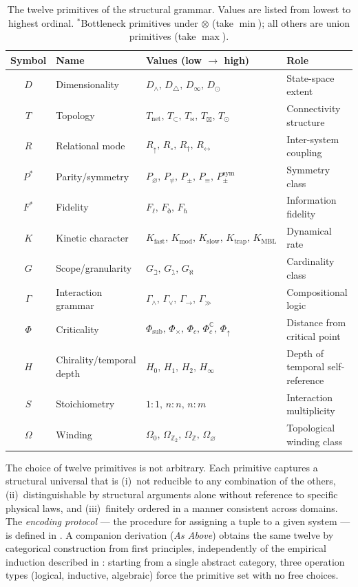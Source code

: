 \documentclass[12pt,a4paper]{article}
\newcommand{\Phic}{\Phi_c}
\newcommand{\Ppms}{P_{\pm}^{\text{sym}}}
\newcommand{\Tbw}{T_{\mathord{\bowtie}}}
\newcommand{\Tin}{T_{\mathord{\subset}}}
\newcommand{\Tbox}{T_{\mathord{\boxtimes}}}
\begin{document}
\begin{table}[htbp]
\centering
\caption{The twelve primitives of the structural grammar.
Values are listed from lowest to highest ordinal.
$^*$Bottleneck primitives under $\otimes$ (take $\min$);
all others are union primitives (take $\max$).}
\label{tab:primitives}
\small
\begin{tabular}{@{}clll@{}}
\toprule
Symbol & Name & Values (low $\to$ high) & Role \\
\midrule
$D$ & Dimensionality &
  $D_\wedge,\, D_\triangle,\, D_\infty,\, D_\odot$ &
  State-space extent \\
$T$ & Topology &
  $T_\text{net},\, \Tin,\, \Tbw,\, \Tbox,\, T_\odot$ &
  Connectivity structure \\
$R$ & Relational mode &
  $R_\uparrow,\, R_\circ,\, R_\dagger,\, R_\leftrightarrow$ &
  Inter-system coupling \\
$P^*$ & Parity/symmetry &
  $P_\varnothing,\, P_\psi,\, P_\pm,\, P_\equiv,\, \Ppms$ &
  Symmetry class \\
$F^*$ & Fidelity &
  $F_\ell,\, F_\eth,\, F_\hbar$ &
  Information fidelity \\
$K$ & Kinetic character &
  $K_\text{fast},\, K_\text{mod},\, K_\text{slow},\, K_\text{trap},\, K_\text{MBL}$ &
  Dynamical rate \\
$G$ & Scope/granularity &
  $G_\beth,\, G_\gimel,\, G_\aleph$ &
  Cardinality class \\
$\Gamma$ & Interaction grammar &
  $\Gamma_\wedge,\, \Gamma_\vee,\, \Gamma_{\to},\, \Gamma_{\gg}$ &
  Compositional logic \\
$\Phi$ & Criticality &
  $\Phi_\text{sub},\, \Phi_\times,\, \Phic,\, \Phic^\mathbb{C},\, \Phi_\uparrow$ &
  Distance from critical point \\
$H$ & Chirality/temporal depth &
  $H_0,\, H_1,\, H_2,\, H_\infty$ &
  Depth of temporal self-reference \\
$S$ & Stoichiometry &
  $1{:}1,\, n{:}n,\, n{:}m$ &
  Interaction multiplicity \\
$\Omega$ & Winding &
  $\Omega_0,\, \Omega_{\mathbb{Z}_2},\, \Omega_{\mathbb{Z}},\, \Omega_\varnothing$ &
  Topological winding class \\
\bottomrule
\end{tabular}
\end{table}

The choice of twelve primitives is not arbitrary. Each primitive
captures a structural universal that is (i)~not reducible to any
combination of the others, (ii)~distinguishable by structural
arguments alone without reference to specific physical laws, and
(iii)~finitely ordered in a manner consistent across domains. The
\emph{encoding protocol} --- the procedure for assigning a tuple to
a given system --- is defined in . A companion
derivation (\emph{As Above}) obtains the same twelve
by categorical construction from first principles, independently of
the empirical induction described in : starting from
a single abstract category, three operation types (logical, inductive,
algebraic) force the primitive set with no free choices.
\end{document}
